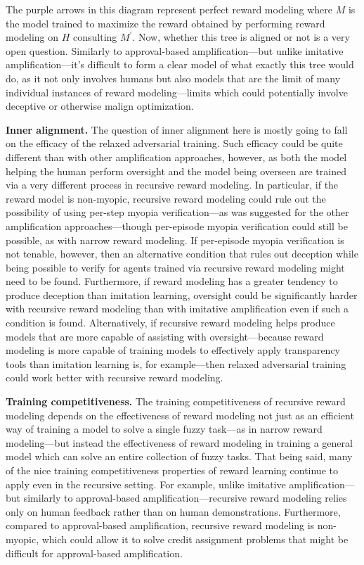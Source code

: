 \documentclass[
  onecolumn,
  natbib,
]{miri-tech-article}
\begin{document}
The purple arrows in this diagram represent perfect reward modeling where $M$ is the model trained to maximize the reward obtained by performing reward modeling on $H$ consulting $M^\prime$. Now, whether this tree is aligned or not is a very open question. Similarly to approval-based amplification---but unlike imitative amplification---it's difficult to form a clear model of what exactly this tree would do, as it not only involves humans but also models that are the limit of many individual instances of reward modeling---limits which could potentially involve deceptive or otherwise malign optimization.

\textbf{Inner alignment.} The question of inner alignment here is mostly going to fall on the efficacy of the relaxed adversarial training. Such efficacy could be quite different than with other amplification approaches, however, as both the model helping the human perform oversight and the model being overseen are trained via a very different process in recursive reward modeling. In particular, if the reward model is non-myopic, recursive reward modeling could rule out the possibility of using per-step myopia verification\cite{TODO: cite https://www.alignmentforum.org/posts/BKM8uQS6QdJPZLqCr/towards-a-mechanistic-understanding-of-corrigibility}---as was suggested for the other amplification approaches---though per-episode myopia verification could still be possible, as with narrow reward modeling. If per-episode myopia verification is not tenable, however, then an alternative condition that rules out deception while being possible to verify for agents trained via recursive reward modeling might need to be found. Furthermore, if reward modeling has a greater tendency to produce deception than imitation learning, oversight could be significantly harder with recursive reward modeling than with imitative amplification even if such a condition is found. Alternatively, if recursive reward modeling helps produce models that are more capable of assisting with oversight---because reward modeling is more capable of training models to effectively apply transparency tools than imitation learning is, for example---then relaxed adversarial training could work better with recursive reward modeling.

\textbf{Training competitiveness.} The training competitiveness of recursive reward modeling depends on the effectiveness of reward modeling not just as an efficient way of training a model to solve a single fuzzy task---as in narrow reward modeling---but instead the effectiveness of reward modeling in training a general model which can solve an entire collection of fuzzy tasks. That being said, many of the nice training competitiveness properties of reward learning continue to apply even in the recursive setting. For example, unlike imitative amplification---but similarly to approval-based amplification---recursive reward modeling relies only on human feedback rather than on human demonstrations. Furthermore, compared to approval-based amplification, recursive reward modeling is non-myopic, which could allow it to solve credit assignment problems that might be difficult for approval-based amplification.
\end{document}

